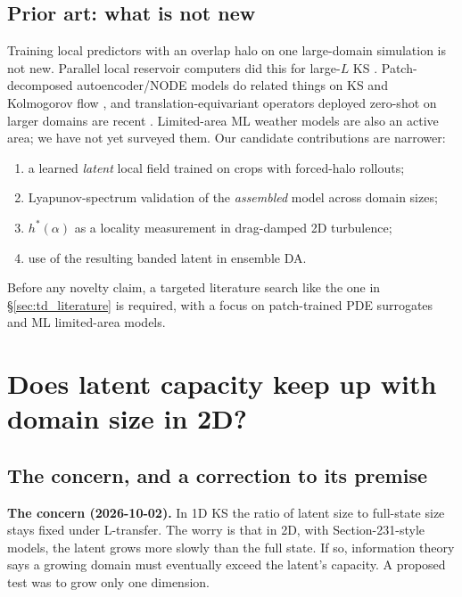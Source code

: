 \documentclass[11pt]{article}
\begin{document}
\subsection{Prior art: what is not new}

Training local predictors with an overlap halo on one large-domain
simulation is not new. Parallel local reservoir computers did this for
large-$L$ KS \cite{pathak2018}. Patch-decomposed autoencoder/NODE models
do related things on KS and Kolmogorov flow \cite{constanteamores2024},
and translation-equivariant operators deployed zero-shot on larger
domains are recent \cite{zeroshotlargerdomains2026}. Limited-area ML
weather models are also an active area; we have not yet surveyed them.
Our candidate contributions are narrower:
\begin{enumerate}[leftmargin=*]
\item a learned \emph{latent} local field trained on crops with
  forced-halo rollouts;
\item Lyapunov-spectrum validation of the \emph{assembled} model across
  domain sizes;
\item $h^*(\alpha)$ as a locality measurement in drag-damped 2D
  turbulence;
\item use of the resulting banded latent in ensemble DA.
\end{enumerate}
Before any novelty claim, a targeted literature search like the one in
\S\ref{sec:td_literature} is required, with a focus on patch-trained PDE
surrogates and ML limited-area models.

\section{Does latent capacity keep up with domain size in 2D?}
\label{sec:capacity}

\subsection{The concern, and a correction to its premise}

\textbf{The concern (2026-10-02).} In 1D KS the ratio of latent size to
full-state size stays fixed under L-transfer. The worry is that in 2D,
with Section-231-style models, the latent grows more slowly than the
full state. If so, information theory says a growing domain must
eventually exceed the latent's capacity. A proposed test was to grow only
one dimension.
\end{document}
